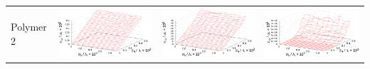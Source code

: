 \documentclass[11pt,a4paper]{article}
\theoremstyle{definition}
\begin{document}
\begin{table}[h]
\begin{tabular}{l | c c c}
	\begin{rotate}{90}Polymer 2\end{rotate} &	\includegraphics[scale=0.4]{figs/even/p2.txt_coeff0.dat.eps} & \includegraphics[scale=0.4]{figs/even/p2.txt_coeff1.dat.eps} & \includegraphics[scale=0.4]{figs/even/p2.txt_coeff2.dat.eps}
  \end{tabular}
  \label{tabl:res_even}
\end{table}
\end{document}
